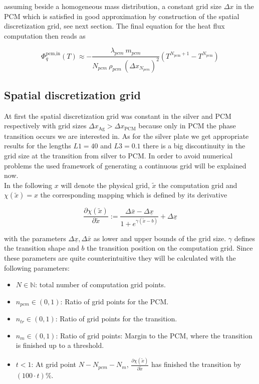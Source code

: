 \documentclass{scrartcl}[12pt, halfparskip]
\begin{document}
assuming beside a homogeneous mass distribution, a constant grid size $\Delta x$ in the PCM which is satisfied in good approximation by construction of the spatial discretization grid, see next section. The final equation for the heat flux computation then reads as

\begin{equation}
	\varPhi_{q}^{\text{pcm,in}}(T) \approx - \frac{\lambda_{pcm} \ m_{pcm}}{N_{pcm} \ \rho_{pcm} \ (\Delta x_{N_{pcm}})^2} \left( T^{N_{\text{pcm}}+1} - T^{N_{\text{pcm}}} \right)
	\label{eq:heat_flux_computation_final}
\end{equation}


\subsection{Spatial discretization grid}
At first the spatial discretization grid was constant in the silver and PCM respectively with grid sizes $\Delta x_{\text{Ag}} > \Delta x_{\text{PCM}}$ because only in PCM the phase transition occurs we are interested in. As for the silver plate we get appropriate results for the lengths $L1=40$ and $L3=0.1$ there is a big discontinuity in the grid size at the transition from silver to PCM. In order to avoid numerical problems the used framework of generating a continuous grid will be explained now. \\
In the following $x$ will denote the physical grid, $\tilde{x}$ the computation grid and $\chi(\tilde{x}) = x$ the corresponding mapping which is defined by its derivative

\begin{equation}
	\frac{\partial \chi(\tilde{x})}{\partial \tilde{x}} := \frac{\Delta \bar{x} - \Delta \underline{x}}{1 + e^{\gamma(\tilde{x} - b)}} + \Delta \underline{x}
\end{equation}

with the parameters $\Delta \underline{x}, \Delta \bar{x}$ as lower and upper bounds of the grid size. $\gamma$ defines the transition shape and $b$ the transition position on the computation grid. Since these parameters are quite counterintuitive they will be calculated with the following parameters:

\begin{itemize}
	\item $N \in \mathbb{N}$: total number of computation grid points.
	\item $n_{pcm} \in (0,1)$: Ratio of grid points for the PCM.
	\item $n_{tr} \in (0,1)$: Ratio of grid points for the transition.
	\item $n_{m} \in (0,1)$: Ratio of grid points: Margin to the PCM, where the transition is finished up to a threshold.
	\item $t < 1$: At grid point $N-N_{pcm}-N_m$, $\frac{\partial \chi(\tilde{x})}{\partial \tilde{x}}$ has finished the transition by $(100 \cdot t)\%$.
\end{itemize}
\end{document}
